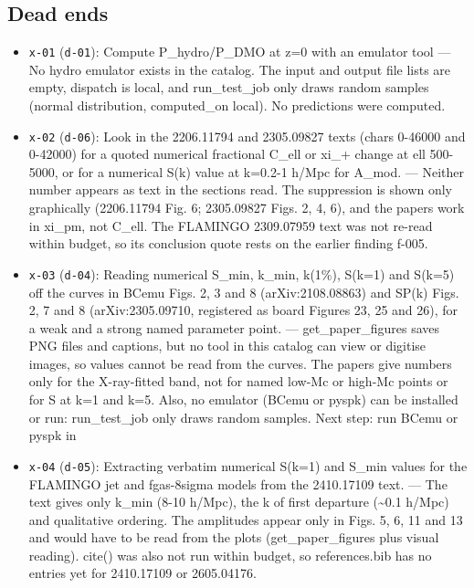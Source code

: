 \documentclass[11pt,a4paper]{article}
\begin{document}
\subsection{Dead ends}
\begin{itemize}
  \item \texttt{x-01} (\texttt{d-01}): Compute P\_hydro/P\_DMO at z=0 with an emulator tool --- No hydro emulator exists in the catalog. The input and output file lists are empty, dispatch is local, and run\_test\_job only draws random samples (normal distribution, computed\_on local). No predictions were computed.
  \item \texttt{x-02} (\texttt{d-06}): Look in the 2206.11794 and 2305.09827 texts (chars 0-46000 and 0-42000) for a quoted numerical fractional C\_ell or xi\_+ change at ell 500-5000, or for a numerical S(k) value at k=0.2-1 h/Mpc for A\_mod. --- Neither number appears as text in the sections read. The suppression is shown only graphically (2206.11794 Fig. 6; 2305.09827 Figs. 2, 4, 6), and the papers work in xi\_pm, not C\_ell. The FLAMINGO 2309.07959 text was not re-read within budget, so its conclusion quote rests on the earlier finding f-005.
  \item \texttt{x-03} (\texttt{d-04}): Reading numerical S\_min, k\_min, k(1\%), S(k=1) and S(k=5) off the curves in BCemu Figs. 2, 3 and 8 (arXiv:2108.08863) and SP(k) Figs. 2, 7 and 8 (arXiv:2305.09710, registered as board Figures 23, 25 and 26), for a weak and a strong named parameter point. --- get\_paper\_figures saves PNG files and captions, but no tool in this catalog can view or digitise images, so values cannot be read from the curves. The papers give numbers only for the X-ray-fitted band, not for named low-Mc or high-Mc points or for S at k=1 and k=5. Also, no emulator (BCemu or pyspk) can be installed or run: run\_test\_job only draws random samples. Next step: run BCemu or pyspk in 
  \item \texttt{x-04} (\texttt{d-05}): Extracting verbatim numerical S(k=1) and S\_min values for the FLAMINGO jet and fgas-8sigma models from the 2410.17109 text. --- The text gives only k\_min (8-10 h/Mpc), the k of first departure (\textasciitilde{}0.1 h/Mpc) and qualitative ordering. The amplitudes appear only in Figs. 5, 6, 11 and 13 and would have to be read from the plots (get\_paper\_figures plus visual reading). cite() was also not run within budget, so references.bib has no entries yet for 2410.17109 or 2605.04176.
\end{itemize}
\end{document}
